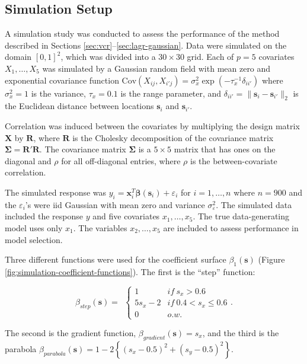 \documentclass[12pt,english,authoryear, review]{article}\usepackage[]{graphicx}\usepackage[]{color}
\theoremstyle{plain}
\theoremstyle{plain}
\begin{document}
\subsection{Simulation Setup}

A simulation study was conducted to assess the performance of the
method described in Sections \ref{sec:vcr}--\ref{sec:lagr-gaussian}.
Data were simulated on the domain $[0,1]^{2}$, which was divided
into a $30\times30$ grid. Each of $p=5$ covariates $X_{1},\dots,X_{5}$
was simulated by a Gaussian random field with mean zero and exponential
covariance function $\text{Cov}\left(X_{ij},X_{i'j}\right)=\sigma_{x}^{2}\exp{\left(-\tau_{x}^{-1}\delta_{ii'}\right)}$
where $\sigma_{x}^{2}=1$ is the variance, $\tau_{x}=0.1$ is the
range parameter, and $\delta_{ii'}=\|\bm{s}_{i}-\bm{s}_{i'}\|_{2}$
is the Euclidean distance between locations $\bm{s}_{i}$ and $\bm{s}_{i'}$. 

Correlation was induced between the covariates by multiplying the
design matrix $\bm{X}$ by $\bm{R}$, where $\bm{R}$ is the Cholesky
decomposition of the covariance matrix $\bm{\Sigma}=\bm{R}'\bm{R}$.
The covariance matrix $\bm{\Sigma}$ is a $5\times5$ matrix that
has ones on the diagonal and $\rho$ for all off-diagonal entries,
where $\rho$ is the between-covariate correlation. 

The simulated response was $y_{i}=\bm{x}_{i}^{T}\bm{\beta}\left(\bm{s}_{i}\right)+\varepsilon_{i}$
for $i=1,\dots,n$ where $n=900$ and the $\varepsilon_{i}$'s were
iid Gaussian with mean zero and variance $\sigma_{\varepsilon}^{2}$.
The simulated data included the response $y$ and five covariates
$x_{1},\dots,x_{5}$. The true data-generating model uses only $x_{1}$.
The variables $x_{2},\dots,x_{5}$ are included to assess performance
in model selection. 

Three different functions were used for the coefficient surface $\beta_{1}(\bm{s})$
(Figure \ref{fig:simulation-coefficient-functions}). The first is
the ``step'' function:

\[
\beta_{step}(\bm{s})=\ \ \begin{cases}
1 & if\ s_{x}>0.6\\
5s_{x}-2 & if\ 0.4<s_{x}\le0.6\\
0 & o.w.
\end{cases}.
\]


The second is the gradient function, $\beta_{gradient}(\bm{s})=s_{x}$,
and the third is the parabola $\beta_{parabola}(\bm{s})=1-2\left\{ (s_{x}-0.5)^{2}+(s_{y}-0.5)^{2}\right\} $.
\end{document}
